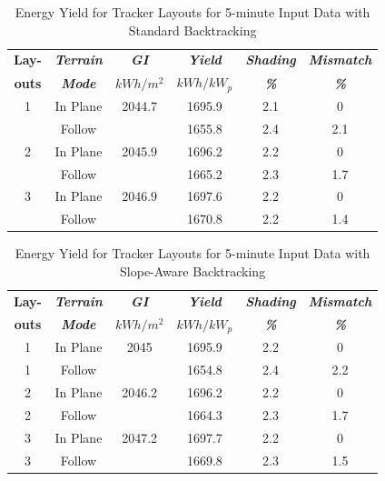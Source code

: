 \documentclass[conference]{IEEEtran}
\begin{document}
\begin{table}[htbp]
\caption{Energy Yield for Tracker Layouts for 5-minute Input Data with Standard Backtracking}
\begin{center}
\begin{tabular}{|c|c|c|c|c|c|}
\hline
\textbf{Lay-}& \textbf{\textit{Terrain}}& \textbf{\textit{GI}}&        \textbf{\textit{Yield}}&        \textbf{\textit{Shading}}& \textbf{\textit{Mismatch}} \\
\textbf{outs}& \textbf{\textit{Mode}}&    \textbf{\textit{$kWh/m^2$}}& \textbf{\textit{$kWh / kW_p$}}& \textbf{\textit{\%}}&      \textbf{\textit{\%}} \\
\hline
1& In Plane& 2044.7&  1695.9& 2.1& 0 \\
 & Follow&         &  1655.8& 2.4& 2.1 \\
\hline
2& In Plane& 2045.9&  1696.2& 2.2& 0 \\
 & Follow&         &  1665.2& 2.3& 1.7 \\
\hline
3& In Plane& 2046.9&  1697.6& 2.2& 0 \\
 & Follow&         &  1670.8& 2.2& 1.4 \\
\hline
\end{tabular}
\label{table:standard-5min}
\end{center}
\end{table}


\begin{table}[htbp]
\caption{Energy Yield for Tracker Layouts for 5-minute Input Data with Slope-Aware Backtracking}
\begin{center}
\begin{tabular}{|c|c|c|c|c|c|}
\hline
\textbf{Lay-}& \textbf{\textit{Terrain}}& \textbf{\textit{GI}}&        \textbf{\textit{Yield}}&        \textbf{\textit{Shading}}& \textbf{\textit{Mismatch}} \\
\textbf{outs}& \textbf{\textit{Mode}}&    \textbf{\textit{$kWh/m^2$}}& \textbf{\textit{$kWh / kW_p$}}& \textbf{\textit{\%}}&      \textbf{\textit{\%}} \\
\hline
1& In Plane& 2045&    1695.9& 2.2& 0 \\
1& Follow&       &    1654.8& 2.4& 2.2 \\
\hline
2& In Plane& 2046.2&  1696.2& 2.2& 0 \\
2& Follow&         &  1664.3& 2.3& 1.7 \\
\hline
3& In Plane& 2047.2&  1697.7& 2.2& 0 \\
3& Follow&         &  1669.8& 2.3& 1.5 \\
\hline
\end{tabular}
\label{table:slope-5min}
\end{center}
\end{table}
\end{document}
